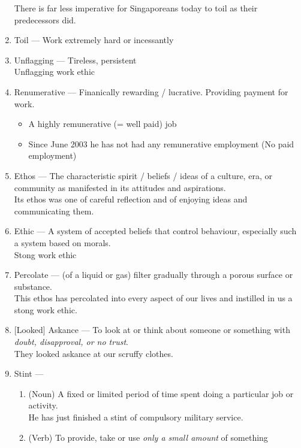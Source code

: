 \documentclass[oneside]{book}
\begin{document}
\begin{enumerate}
        \footnotesize There is far less imperative for Singaporeans today to toil as their predecessors did. \normalsize
        \item Toil --- Work extremely hard or incessantly
        \item Unflagging --- Tireless, persistent\\
        \footnotesize Unflagging work ethic \normalsize
        \item Renumerative --- Finanically rewarding / lucrative. Providing payment for work.
        \footnotesize \begin{itemize}
            \item A highly remunerative (= well paid) job
            \item Since June 2003 he has not had any remunerative employment (No paid employment)
        \end{itemize} \normalsize
        \item Ethos --- The characteristic spirit / beliefs / ideas of a culture, era, or community as manifested in its attitudes and aspirations.\\
        \footnotesize Its ethos was one of careful reflection and of enjoying ideas and communicating them. \normalsize
        \item Ethic --- A system of accepted beliefs that control behaviour, especially such a system based on morals.\\
        \footnotesize Stong work ethic \normalsize
        \item Percolate --- (of a liquid or gas) filter gradually through a porous surface or substance.\\
        \footnotesize This ethos has percolated into every aspect of our lives and instilled in us a stong work ethic. \normalsize
        \item {[Looked]} Askance --- To look at or think about someone or something with \emph{doubt, disapproval, or no trust}.\\
        \footnotesize They looked askance at our scruffy clothes. \normalsize
        \item Stint ---
        \begin{enumerate}
            \item (Noun) A fixed or limited period of time spent doing a particular job or activity.\\
            \footnotesize He has just finished a stint of compulsory military service. \normalsize
            \item (Verb) To provide, take or use \emph{only a small amount} of something\\

\end{enumerate}
\end{enumerate}
\end{document}
